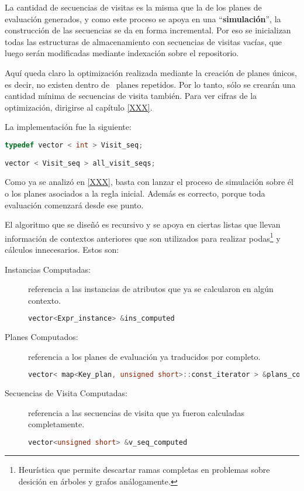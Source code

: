 La cantidad de secuencias de visitas es la misma que la de los planes de evaluación generados, y como este proceso se apoya en una ``\textbf{simulación}'', la construcción de las secuencias se da en forma incremental. Por eso se inicializan todas las estructuras de almacenamiento con secuencias de visitas vacías, que luego serán modificadas mediante indexación sobre el repositorio.

Aquí queda claro la optimización realizada mediante la creación de planes únicos, es decir, no existen dentro de \maggen\ planes repetidos. Por lo tanto, sólo se crearán una cantidad mínima de secuencias de visita también. Para ver cifras de la optimización, dirigirse al capítulo \ref{XXX}.

La implementación fue la siguiente:

\begin{lstlisting}[language=C++, basicstyle=\scriptsize, columns=fullflexible, linewidth=7cm]
typedef vector < int > Visit_seq;

vector < Visit_seq > all_visit_seqs;
\end{lstlisting}

Como ya se analizó en \ref{XXX}, basta con lanzar el proceso de simulación sobre él o los planes asociados a la regla inicial. Además es correcto, porque toda evaluación comenzará desde ese punto.

El algoritmo que se diseñó es recursivo y se apoya en ciertas listas que llevan información de contextos anteriores que son utilizados para realizar podas\footnote{Heurística que permite descartar ramas completas en problemas sobre desición en árboles y grafos análogamente. } y cálculos innecesarios. Estos son:

\begin{description}
\item [Instancias Computadas:] referencia a las instancias de atributos que ya se calcularon en algún contexto.
\begin{lstlisting}[language=C++, basicstyle=\scriptsize]
vector<Expr_instance> &ins_computed
\end{lstlisting}

\item [Planes Computados:] referencia a los planes de evaluación ya traducidos por completo.
\begin{lstlisting}[language=C++, basicstyle=\scriptsize]
vector< map<Key_plan, unsigned short>::const_iterator > &plans_computed
\end{lstlisting}

\item [Secuencias de Visita Computadas:] referencia a las secuencias de visita que ya fueron calculadas completamente.
\begin{lstlisting}[language=C++, basicstyle=\scriptsize]
vector<unsigned short> &v_seq_computed
\end{lstlisting}
\end{description}

